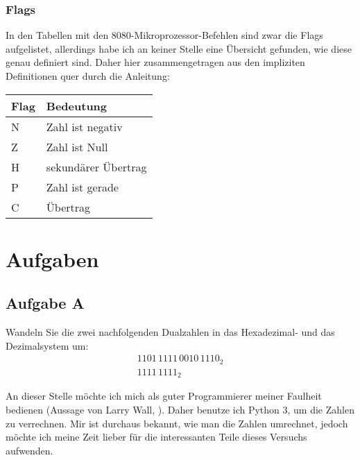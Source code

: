 \subsubsection{Flags}

In den Tabellen mit den 8080-Mikroprozessor-Befehlen sind zwar die Flags
aufgelistet, allerdings habe ich an keiner Stelle eine Übersicht gefunden, wie
diese genau definiert sind. Daher hier zusammengetragen aus den impliziten
Definitionen quer durch die Anleitung:

\begin{tabular}{ll}
	Flag & Bedeutung \\
	\hline
	N & Zahl ist negativ \\
	Z & Zahl ist Null \\
	H & sekundärer Übertrag \cite[Abschnitt~„Flags“]{wikipedia/8080} \\
	P & Zahl ist gerade \\
	C & Übertrag \\
\end{tabular}


\FloatBarrier
\section{Aufgaben}

\subsection{Aufgabe A}

\begin{problem}
	Wandeln Sie die zwei nachfolgenden Dualzahlen in das Hexadezimal- und das
	Dezimalsystem um:
	\begin{gather*}
		1101\,1111\,0010\,1110_2 \\
		1111\,1111_2
	\end{gather*}
\end{problem}

An dieser Stelle möchte ich mich als guter Programmierer meiner Faulheit
bedienen (Aussage von Larry Wall, \cite{threevirtues.com}). Daher benutze ich
Python 3, um die Zahlen zu verrechnen. Mir ist durchaus bekannt, wie man die
Zahlen umrechnet, jedoch möchte ich meine Zeit lieber für die interessanten
Teile dieses Versuchs aufwenden.

